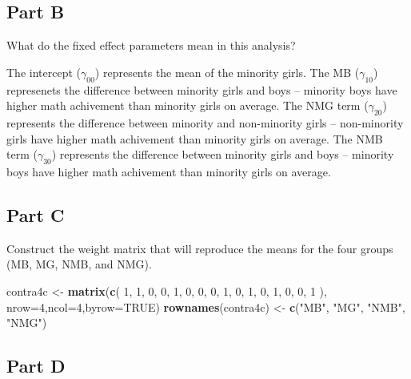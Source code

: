 \documentclass[]{article}
\newenvironment{Shaded}{\begin{snugshade}}{\end{snugshade}}
\newcommand{\KeywordTok}[1]{\textcolor[rgb]{0.13,0.29,0.53}{\textbf{#1}}}
\newcommand{\DataTypeTok}[1]{\textcolor[rgb]{0.13,0.29,0.53}{#1}}
\newcommand{\DecValTok}[1]{\textcolor[rgb]{0.00,0.00,0.81}{#1}}
\newcommand{\StringTok}[1]{\textcolor[rgb]{0.31,0.60,0.02}{#1}}
\newcommand{\OtherTok}[1]{\textcolor[rgb]{0.56,0.35,0.01}{#1}}
\newcommand{\NormalTok}[1]{#1}
\begin{document}
\subsection{Part B}\label{part-b-2}

What do the fixed effect parameters mean in this analysis?

The intercept (\(\gamma_{00}\)) represents the mean of the minority
girls. The MB (\(\gamma_{10}\)) represenets the difference between
minority girls and boys -- minority boys have higher math achivement
than minority girls on average. The NMG term (\(\gamma_{20}\))
represents the difference between minority and non-minority girls --
non-minority girls have higher math achivement than minority girls on
average. The NMB term (\(\gamma_{30}\)) represents the difference
between minority girls and boys -- minority boys have higher math
achivement than minority girls on average.

\subsection{Part C}\label{part-c-2}

Construct the weight matrix that will reproduce the means for the four
groups (MB, MG, NMB, and NMG).

\begin{Shaded}
\begin{Highlighting}[]
\NormalTok{contra4c <-}\StringTok{ }\KeywordTok{matrix}\NormalTok{(}\KeywordTok{c}\NormalTok{(}
   \DecValTok{1}\NormalTok{, }\DecValTok{1}\NormalTok{, }\DecValTok{0}\NormalTok{, }\DecValTok{0}\NormalTok{,}
   \DecValTok{1}\NormalTok{, }\DecValTok{0}\NormalTok{, }\DecValTok{0}\NormalTok{, }\DecValTok{0}\NormalTok{,}
   \DecValTok{1}\NormalTok{, }\DecValTok{0}\NormalTok{, }\DecValTok{1}\NormalTok{, }\DecValTok{0}\NormalTok{,}
   \DecValTok{1}\NormalTok{, }\DecValTok{0}\NormalTok{, }\DecValTok{0}\NormalTok{, }\DecValTok{1}
\NormalTok{), }\DataTypeTok{nrow=}\DecValTok{4}\NormalTok{,}\DataTypeTok{ncol=}\DecValTok{4}\NormalTok{,}\DataTypeTok{byrow=}\OtherTok{TRUE}\NormalTok{)}
\KeywordTok{rownames}\NormalTok{(contra4c) <-}\StringTok{ }\KeywordTok{c}\NormalTok{(}\StringTok{"MB"}\NormalTok{, }\StringTok{"MG"}\NormalTok{, }\StringTok{"NMB"}\NormalTok{, }\StringTok{"NMG"}\NormalTok{)}
\end{Highlighting}
\end{Shaded}

\subsection{Part D}\label{part-d-2}
\end{document}

